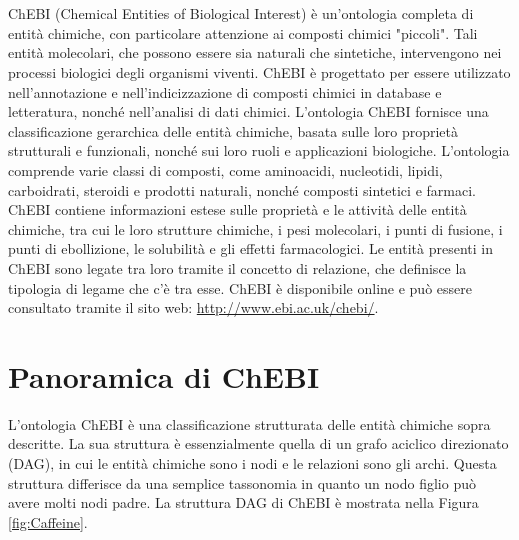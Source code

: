 \documentclass[12pt,a4paper,openright,twoside]{book}
\begin{document}
\frontmatter



\tableofcontents

\mainmatter

\chapter{\introductionname}
\label{chap:introduction}

ChEBI (Chemical Entities of Biological Interest) è un'ontologia completa di entità chimiche, con particolare attenzione ai composti chimici "piccoli". Tali entità molecolari, che possono essere
sia naturali che sintetiche, intervengono nei processi biologici degli organismi viventi. ChEBI è progettato per essere utilizzato nell'annotazione e nell'indicizzazione di composti chimici in database e letteratura, nonché nell'analisi di dati chimici.
L'ontologia ChEBI fornisce una classificazione gerarchica delle entità chimiche, basata sulle loro proprietà strutturali e funzionali, nonché sui loro ruoli e applicazioni biologiche. L'ontologia comprende varie classi di composti, come aminoacidi, nucleotidi, lipidi, carboidrati, steroidi e prodotti naturali, nonché composti sintetici e farmaci.
ChEBI contiene informazioni estese sulle proprietà e le attività delle entità chimiche, tra cui le loro strutture chimiche, i pesi molecolari, i punti di fusione, i punti di ebollizione, le solubilità e gli effetti farmacologici.
Le entità presenti in ChEBI sono legate tra loro tramite il concetto di relazione, che definisce la tipologia di legame che c'è tra esse.
ChEBI è disponibile online e può essere consultato tramite il sito web: \url{http://www.ebi.ac.uk/chebi/}.

\chapter{Panoramica di ChEBI}
\label{chap:panoramica}
L'ontologia ChEBI è una classificazione strutturata delle entità chimiche sopra descritte. La sua struttura è essenzialmente quella di un grafo aciclico direzionato (DAG), in cui le entità chimiche sono i nodi e le relazioni sono gli archi.
Questa struttura differisce da una semplice tassonomia in quanto un nodo figlio può avere molti nodi padre.
La struttura DAG di ChEBI è mostrata nella Figura \ref{fig:Caffeine}.
\end{document}
